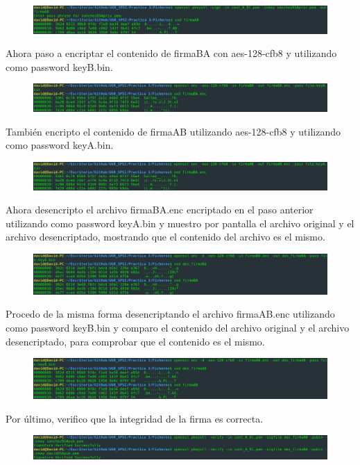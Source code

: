 \documentclass[10pt,a4paper,spanish]{report}
\begin{document}
\begin{figure}[!hbp]
 \centering  \includegraphics[width=1\textwidth]{./Imagenes/8_10.png}
\end{figure}

\noindent
Ahora paso a encriptar el contenido de firmaBA con aes-128-cfb8 y utilizando como password keyB.bin.

\begin{figure}[!hbp]
 \centering  \includegraphics[width=1\textwidth]{./Imagenes/8_11.png}
\end{figure}


\noindent
También encripto el contenido de firmaAB utilizando aes-128-cfb8 y utilizando como password keyA.bin.

\begin{figure}[!hbp]
 \centering  \includegraphics[width=1\textwidth]{./Imagenes/8_12.png}
\end{figure}

\noindent
Ahora desencripto el archivo firmaBA.enc encriptado en el paso anterior utilizando como password keyA.bin y muestro por pantalla el archivo original y el archivo desencriptado, mostrando que el contenido del archivo es el mismo.

\begin{figure}[!hbp]
 \centering  \includegraphics[width=1\textwidth]{./Imagenes/8_13.png}
\end{figure}

\noindent
Procedo de la misma forma desencriptando el archivo firmaAB.enc utilizando como password keyB.bin y comparo el contenido del archivo original y el archivo desencriptado, para comprobar que el contenido es el mismo.

\begin{figure}[!hbp]
 \centering  \includegraphics[width=1\textwidth]{./Imagenes/8_14.png}
\end{figure}

\noindent
Por último, verifico que la integridad de la firma es correcta.

\begin{figure}[!hbp]
 \centering  \includegraphics[width=1\textwidth]{./Imagenes/8_15.png}
\end{figure}
\end{document}
